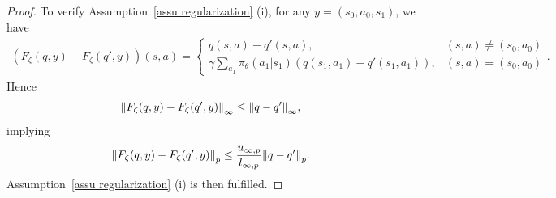 \documentclass[twoside,11pt]{article}
\numberwithin{assucounter}{section}
\begin{document}
\begin{proof}
  To verify Assumption~\ref{assu regularization} (i), for any $y = (s_0, a_0, s_1)$,
  we have
  \begin{align}
    \left(F_\zeta(q, y) - F_\zeta(q', y)\right)(s, a) = \begin{cases}
      q(s, a) - q'(s, a), & (s, a) \neq (s_0, a_0) \\
      \gamma \sum_{a_1}\pi_\theta(a_1| s_1) \left(q(s_1, a_1) - q'(s_1, a_1)\right), &(s, a) = (s_0, a_0)
    \end{cases}.
  \end{align}
  Hence
  \begin{align}
    \norm{F_\zeta(q, y) - F_\zeta(q', y)}_\infty \leq \norm{q - q'}_\infty,
  \end{align}
  implying
  \begin{align}
    \norm{F_\zeta(q, y) - F_\zeta(q', y)}_p \leq \frac{u_{\infty, p}}{l_{\infty, p}} \norm{q - q'}_p.
  \end{align}
  Assumption~\ref{assu regularization} (i) is then fulfilled.


\end{proof}
\end{document}
